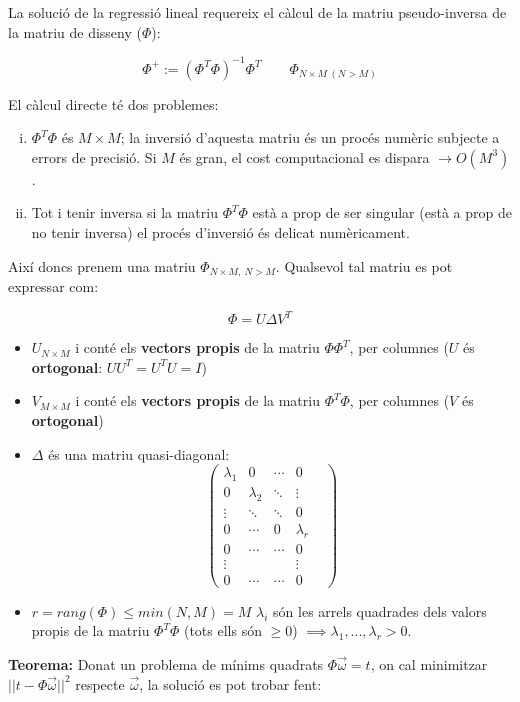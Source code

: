 \documentclass[a4paper]{article}
\begin{document}
La solució de la regressió lineal requereix el càlcul de la matriu pseudo-inversa de la matriu de disseny ($\Phi$):

$$ \Phi^+ := ( \Phi^T \Phi)^{-1} \Phi^T \qquad \Phi_{N \times M \ (N > M)} $$

El càlcul directe té dos problemes:
\begin{enumerate}[i)]
	\item $\Phi^T \Phi$ és $M \times M$; la inversió d'aquesta matriu és un procés numèric subjecte a errors de precisió. Si $M$ és gran, el cost computacional es dispara $\rightarrow O(M^3)$.
	\item Tot i tenir inversa si la matriu $\Phi^T \Phi$ està a prop de ser singular (està a prop de no tenir inversa) el procés d'inversió és delicat numèricament.
\end{enumerate}

Així doncs prenem una matriu $\Phi_{N \times M, \ N > M}$. Qualsevol tal matriu es pot expressar com:

$$
\Phi = U \Delta V^T
$$

\begin{itemize}
	\item $U_{N \times M}$ i conté els \textbf{vectors propis} de la matriu $\Phi \Phi^T$, per columnes ($U$ és \textbf{ortogonal}: $U U^T = U^T U = I$)
	\item $V_{M \times M}$ i conté els \textbf{vectors propis} de la matriu $\Phi^T \Phi$, per columnes ($V$ és \textbf{ortogonal})
	\item $\Delta$ és una matriu quasi-diagonal:
	$$
	\begin{pmatrix}
	\lambda_1 & 0 & \cdots &  0 \\
	0 & \lambda_2 & \ddots &  \vdots \\
	\vdots & \ddots & \ddots & 0 & \\
	0 & \cdots & 0 &\lambda_r \\
	0 & \cdots & \cdots & 0 \\
	\vdots & & & \vdots \\
	0 & \cdots & \cdots & 0
	\end{pmatrix}
	$$
	
	\item  $r = rang(\Phi) \le min(N,M) = M$ $\lambda_i$ són les arrels quadrades dels valors propis de la matriu $\Phi^T \Phi$ (tots ells són $\ge 0$) $\implies \lambda_1, ...,\lambda_r > 0$.
\end{itemize}

\textbf{Teorema:} Donat un problema de mínims quadrats $ \Phi \vec{\omega} = t $, on cal minimitzar $ ||t - \Phi \vec{\omega} ||^2 $ respecte $\vec{\omega}$, la solució es pot trobar fent:
\end{document}
